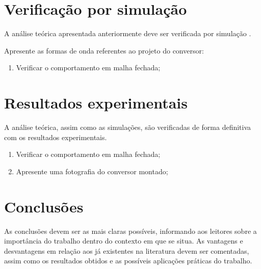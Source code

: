\section{Verificação por simulação}

A análise teórica apresentada anteriormente deve ser verificada por simulação \cite{noauthor_psim_nodate}.
									
 Apresente as formas de onda referentes ao projeto do conversor:
 
\begin{enumerate}
	\item Verificar o comportamento em malha fechada;
\end{enumerate}


\section{Resultados experimentais}


A análise teórica, assim como as simulações, são verificadas de forma definitiva com os resultados experimentais.
\begin{enumerate}									
	\item Verificar o comportamento em malha fechada;
	\item  Apresente uma fotografia do conversor montado;
\end{enumerate}

\section{Conclusões} 


As conclusões devem ser as mais claras possíveis, informando aos leitores sobre a importância do trabalho dentro do contexto em que se situa. As vantagens e desvantagens em relação aos já existentes na literatura devem ser comentadas, assim como os resultados obtidos e as possíveis aplicações práticas do trabalho.





\balance


